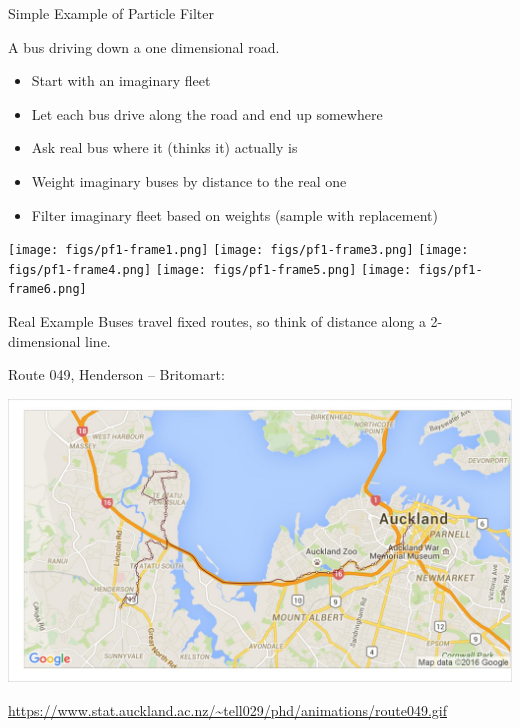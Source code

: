 \documentclass[10pt,t]{beamer}
\begin{document}
\begin{frame}{Simple Example of Particle Filter}

  A bus driving down a one dimensional road.
  \onslide<+->

  \begin{itemize}[<+- | alert@+>]
  \item Start with an imaginary fleet
  \item Let each bus drive along the road and end up somewhere
  \item Ask real bus where it (thinks it) actually is
  \item Weight imaginary buses by distance to the real one
  \item Filter imaginary fleet based on weights (sample with replacement)
  \end{itemize}
  
  \begin{overprint}
    \centering
    \texttt{[image: figs/pf1-frame1.png]}
    \centering
    \texttt{[image: figs/pf1-frame3.png]}
    \centering
    \texttt{[image: figs/pf1-frame4.png]}
    \centering
    \texttt{[image: figs/pf1-frame5.png]}
    \centering
    \texttt{[image: figs/pf1-frame6.png]}
  \end{overprint}

  \onslide<+->
\end{frame}


\begin{frame}{Real Example}
  Buses travel fixed routes, so think of distance along a 2-dimensional line.
  
  Route 049, Henderson -- Britomart:
  
  {\centering
  \includegraphics[width=\textwidth]{pf/particle_map001.jpg}}

  \footnotesize\url{https://www.stat.auckland.ac.nz/~tell029/phd/animations/route049.gif}
\end{frame}
\end{document}
